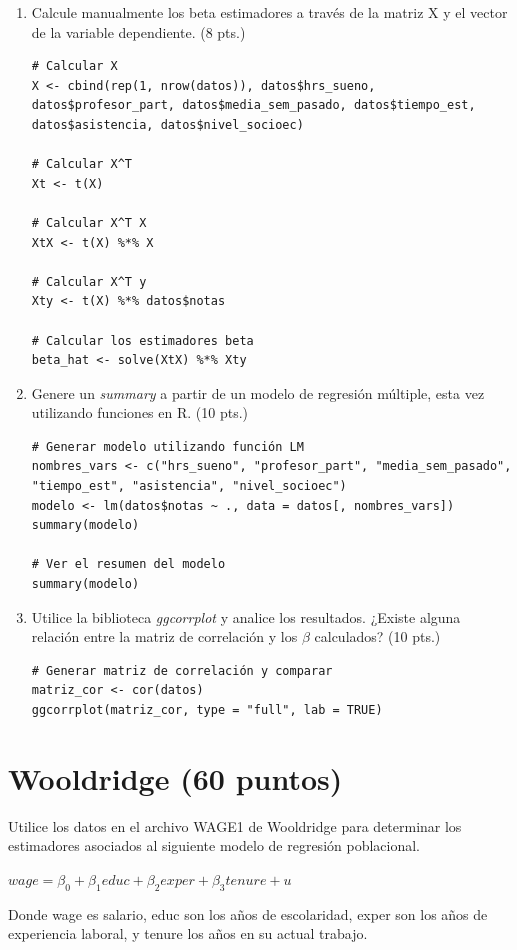 \documentclass[letterpaper,11pt]{article}
\begin{document}
\begin{enumerate}
    \item Calcule manualmente los beta estimadores a través de la matriz X y el vector de la variable dependiente. (8 pts.)

\begin{lstlisting}
# Calcular X
X <- cbind(rep(1, nrow(datos)), datos$hrs_sueno, datos$profesor_part, datos$media_sem_pasado, datos$tiempo_est, datos$asistencia, datos$nivel_socioec)

# Calcular X^T
Xt <- t(X)

# Calcular X^T X
XtX <- t(X) %*% X

# Calcular X^T y
Xty <- t(X) %*% datos$notas

# Calcular los estimadores beta
beta_hat <- solve(XtX) %*% Xty
\end{lstlisting}

    \item Genere un \textit{summary} a partir de un modelo de regresión múltiple, esta vez utilizando funciones en R. (10 pts.)
\begin{lstlisting}
# Generar modelo utilizando función LM
nombres_vars <- c("hrs_sueno", "profesor_part", "media_sem_pasado", "tiempo_est", "asistencia", "nivel_socioec")
modelo <- lm(datos$notas ~ ., data = datos[, nombres_vars])
summary(modelo)

# Ver el resumen del modelo
summary(modelo)
\end{lstlisting}
    \item Utilice la biblioteca \textit{ggcorrplot} y analice los resultados. ¿Existe alguna relación entre la matriz de correlación y los $\beta$ calculados? (10 pts.)
\begin{lstlisting}
# Generar matriz de correlación y comparar
matriz_cor <- cor(datos)
ggcorrplot(matriz_cor, type = "full", lab = TRUE)
\end{lstlisting}

\end{enumerate}

\section{Wooldridge  (60 puntos)}

Utilice los datos en el archivo WAGE1 de Wooldridge para determinar los estimadores asociados al  siguiente modelo de regresión poblacional.

$wage=\beta_0+ \beta_1educ +\beta_2exper+ \beta_3tenure+u$


Donde wage es salario, educ son los años de escolaridad, 
exper son los años de experiencia laboral, y tenure los años en su actual trabajo.
\end{document}
